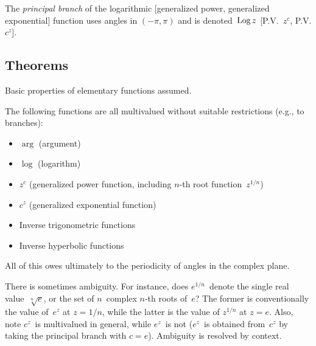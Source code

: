 \begin{defn}
The \emph{principal branch} of the logarithmic [generalized power, generalized exponential] function uses angles in \((-\pi,\pi)\) and is denoted~\(\operatorname{Log} z\) [P.V.~\(z^c\), P.V. \(c^z\)].
\end{defn}
\subsection*{Theorems}
Basic properties of elementary functions assumed.
\begin{rmk}
The following functions are all multivalued without suitable restrictions (e.g., to branches):
\begin{itemize}[itemsep=0pt]
\item \(\arg\) (argument)
\item \(\log\) (logarithm)
\item \(z^c\) (generalized power function, including \(n\)-th root function~\(z^{1/n}\))
\item \(c^z\) (generalized exponential function)
\item Inverse trigonometric functions
\item Inverse hyperbolic functions
\end{itemize}
All of this owes ultimately to the periodicity of angles in the complex plane.

There is sometimes ambiguity. For instance, does \(e^{1/n}\)~denote the single real value~\(\sqrt[n]{e}\), or the set of \(n\)~complex \(n\)-th roots of~\(e\)? The former is conventionally the value of~\(e^z\) at \(z=1/n\), while the latter is the value of \(z^{1/n}\) at \(z=e\). Also, note \(c^z\)~is multivalued in general, while \(e^z\)~is not (\(e^z\)~is obtained from~\(c^z\) by taking the principal branch with \(c=e\)). Ambiguity is resolved by context.
\end{rmk}
